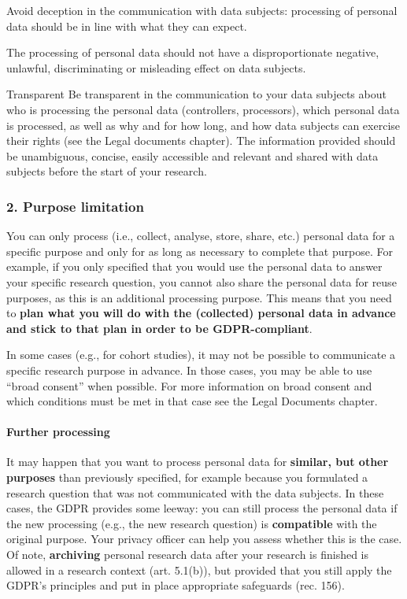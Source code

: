 \documentclass[
]{book}
\begin{document}
Avoid deception in the communication with data subjects: processing of personal data should
be in line with what they can expect.

The processing of personal data should not have a disproportionate negative, unlawful,
discriminating or misleading effect on data subjects.

Transparent
Be transparent in the communication to your data subjects about who is processing the personal
data (controllers, processors), which personal data is processed, as well as why and for how long,
and how data subjects can exercise their rights (see the Legal documents chapter).
The information provided should be unambiguous, concise, easily accessible and relevant and shared
with data subjects before the start of your research.

\hypertarget{purpose-limitation}{%
\subsubsection{2. Purpose limitation}\label{purpose-limitation}}

You can only process (i.e., collect, analyse, store, share, etc.) personal data for a specific purpose
and only for as long as necessary to complete that purpose. For example, if you only specified
that you would use the personal data to answer your specific research question, you cannot also
share the personal data for reuse purposes, as this is an additional processing purpose. This means
that you need to \textbf{plan what you will do with the (collected) personal data in advance and stick to
that plan in order to be GDPR-compliant}.

In some cases (e.g., for cohort studies), it may not be possible to communicate a specific research purpose in advance. In those cases, you may be able to use ``broad consent'' when possible.
For more information on broad consent and which conditions must be met in that case see the Legal Documents chapter.

\hypertarget{further-processing}{%
\paragraph{Further processing}\label{further-processing}}

It may happen that you want to process personal data for \textbf{similar, but other purposes} than previously
specified, for example because you formulated a research question that was not communicated with the
data subjects. In these cases, the GDPR provides some leeway: you can still process the personal data if
the new processing (e.g., the new research question) is \textbf{compatible} with the original purpose.
Your privacy officer
can help you assess whether this is the case. Of note, \textbf{archiving} personal research data after
your research is finished is allowed in a research context
(art. 5.1(b)), but provided that you
still apply the GDPR's principles and put in place appropriate safeguards
(rec. 156).
\end{document}
